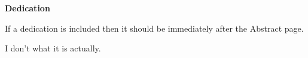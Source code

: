\begin{center}
\LARGE\textbf {Dedication}
\end{center}
\vspace{5pt}

If a dedication is included then it should be immediately after the Abstract page.\par
I don't what it is actually.

